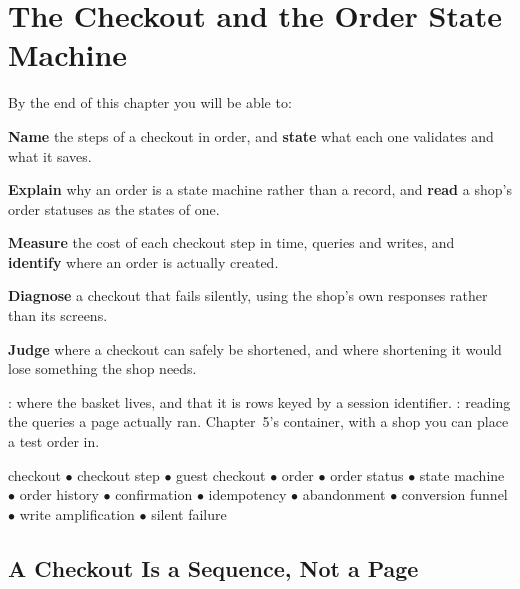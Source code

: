 \chapter{The Checkout and the Order State Machine}\label{ch:checkout}

\begin{outcomes}
By the end of this chapter you will be able to:
\begin{tight}
  \item \textbf{Name} the steps of a checkout in order, and \textbf{state}
        what each one validates and what it saves.
  \item \textbf{Explain} why an order is a state machine rather than a record,
        and \textbf{read} a shop's order statuses as the states of one.
  \item \textbf{Measure} the cost of each checkout step in time, queries and
        writes, and \textbf{identify} where an order is actually created.
  \item \textbf{Diagnose} a checkout that fails silently, using the shop's own
        responses rather than its screens.
  \item \textbf{Judge} where a checkout can safely be shortened, and where
        shortening it would lose something the shop needs.
\end{tight}
\end{outcomes}

\begin{prereq}
: where the basket lives, and that it is rows keyed by a session
identifier. : reading the queries a page actually ran.
Chapter~5's container, with a shop you can place a test order in.
\end{prereq}

\begin{keyterms}
checkout $\bullet$ checkout step $\bullet$ guest checkout $\bullet$ order
$\bullet$ order status $\bullet$ state machine $\bullet$ order history
$\bullet$ confirmation $\bullet$ idempotency $\bullet$ abandonment $\bullet$
conversion funnel $\bullet$ write amplification $\bullet$ silent failure
\end{keyterms}

\section{A Checkout Is a Sequence, Not a Page}

